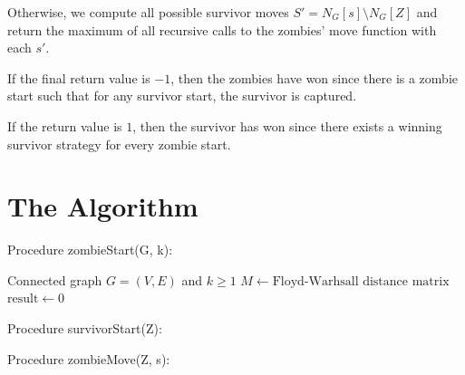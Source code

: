 \documentclass[letterpaper, 10pt]{article}
\begin{document}
Otherwise, we compute all possible survivor moves $S' = N_G[s] \setminus N_G[Z]$
and return the maximum of all recursive calls to the zombies' move function with each
$s'$.

If the final return value is $-1$, then the zombies have won since there is a
zombie start such that for any survivor start, the survivor is captured.

If the return value is $1$, then the survivor has won since there exists a winning survivor strategy
for every zombie start.

\section{The Algorithm}

Procedure zombieStart(G, k):

\begin{algorithmic}
\REQUIRE Connected graph $G=(V,E)$ and $k \geq 1$
\STATE $M \leftarrow \text{Floyd-Warhsall distance matrix}$
\STATE $\text{result} \leftarrow 0$
  \ENDIF
\ENDFOR
{}
\end{algorithmic}

Procedure survivorStart(Z):

\begin{algorithmic}
    \ENDIF
    \ENDIF
  \ENDFOR
\end{algorithmic}

Procedure zombieMove(Z, s):
\begin{algorithmic}
      \ENDIF {}
    \ENDIF
    \ENDFOR
  \ENDFOR
    \ENDIF
  \ENDFOR
\end{algorithmic}
\end{document}
